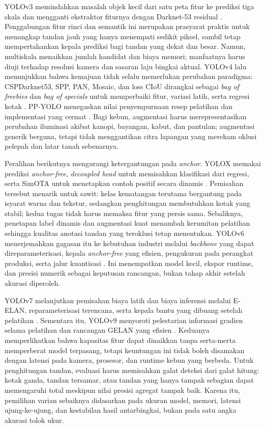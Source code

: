 YOLOv3 memindahkan masalah objek kecil dari satu peta fitur ke prediksi tiga skala dan mengganti ekstraktor fiturnya dengan Darknet-53 residual \cite{redmon2018yolov3}. Penggabungan fitur rinci dan semantik ini merupakan prasyarat praktis untuk menangkap tandan jauh yang hanya menempati sedikit piksel, sambil tetap mempertahankan kepala prediksi bagi tandan yang dekat dan besar. Namun, multiskala menaikkan jumlah kandidat dan biaya memori; manfaatnya harus diuji terhadap resolusi kamera dan sasaran laju bingkai aktual. YOLOv4 lalu menunjukkan bahwa kemajuan tidak selalu memerlukan perubahan paradigma: CSPDarknet53, SPP, PAN, Mosaic, dan loss CIoU dirangkai sebagai \textit{bag of freebies} dan \textit{bag of specials} untuk memperbaiki fitur, variasi latih, serta regresi kotak \cite{bochkovskiy2020yolov4}. PP-YOLO menegaskan nilai penyempurnaan resep pelatihan dan implementasi yang cermat \cite{long2020ppyolo}. Bagi kebun, augmentasi harus merepresentasikan perubahan iluminasi akibat kanopi, bayangan, kabut, dan pantulan; augmentasi generik berguna, tetapi tidak menggantikan citra lapangan yang merekam oklusi pelepah dan latar tanah sebenarnya.

Peralihan berikutnya mengurangi ketergantungan pada \textit{anchor}. YOLOX memakai prediksi \textit{anchor-free}, \textit{decoupled head} untuk memisahkan klasifikasi dari regresi, serta SimOTA untuk menetapkan contoh positif secara dinamis \cite{ge2021yolox}. Pemisahan tersebut menarik untuk sawit: kelas kematangan terutama bergantung pada isyarat warna dan tekstur, sedangkan penghitungan membutuhkan kotak yang stabil; kedua tugas tidak harus memaksa fitur yang persis sama. Sebaliknya, penetapan label dinamis dan augmentasi kuat menambah kerumitan pelatihan sehingga kualitas anotasi tandan yang teroklusi tetap menentukan. YOLOv6 menerjemahkan gagasan itu ke kebutuhan industri melalui \textit{backbone} yang dapat direparameterisasi, kepala \textit{anchor-free} yang efisien, pengukuran pada perangkat produksi, serta jalur kuantisasi \cite{li2022yolov6}. Ini menempatkan model kecil, ekspor runtime, dan presisi numerik sebagai keputusan rancangan, bukan tahap akhir setelah akurasi diperoleh.

YOLOv7 melanjutkan pemisahan biaya latih dan biaya inferensi melalui E-ELAN, reparameterisasi terencana, serta kepala bantu yang dibuang setelah pelatihan \cite{wang2023yolov7}. Sementara itu, YOLOv9 menyoroti pelestarian informasi gradien selama pelatihan dan rancangan GELAN yang efisien \cite{wang2024yolov9}. Keduanya memperlihatkan bahwa kapasitas fitur dapat dinaikkan tanpa serta-merta memperberat model terpasang, tetapi keuntungan ini tidak boleh disamakan dengan latensi pada kamera, prosesor, dan runtime kebun yang berbeda. Untuk penghitungan tandan, evaluasi harus memisahkan galat deteksi dari galat hitung: kotak ganda, tandan tersamar, atau tandan yang hanya tampak sebagian dapat memengaruhi total meskipun nilai presisi agregat tampak baik. Karena itu, pemilihan varian sebaiknya didasarkan pada ukuran model, memori, latensi ujung-ke-ujung, dan kestabilan hasil antarbingkai, bukan pada satu angka akurasi tolok ukur.

